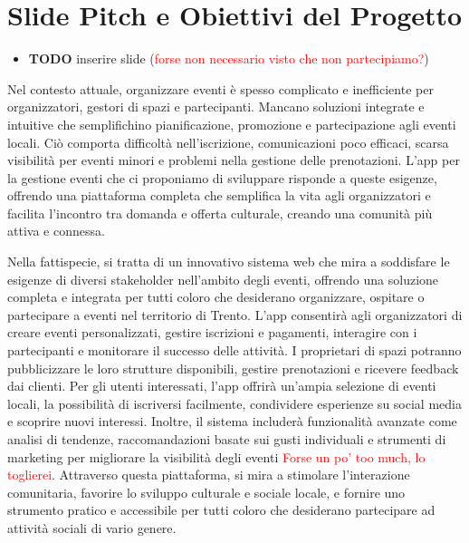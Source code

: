 \documentclass[9pt]{extarticle}
\begin{document}
\customtitle

\tableofcontents
\newpage

\section{Slide Pitch e Obiettivi del Progetto}

\begin{itemize}
	\item \textbf{TODO} inserire slide (\textcolor{red}{forse non necessario visto che non partecipiamo?})
\end{itemize}


Nel contesto attuale, organizzare eventi è spesso complicato e inefficiente per organizzatori, gestori di spazi e partecipanti. Mancano soluzioni integrate e intuitive che semplifichino pianificazione, promozione e partecipazione agli eventi locali. Ciò comporta difficoltà nell'iscrizione, comunicazioni poco efficaci, scarsa visibilità per eventi minori e problemi nella gestione delle prenotazioni. L'app per la gestione eventi che ci proponiamo di sviluppare risponde a queste esigenze, offrendo una piattaforma completa che semplifica la vita agli organizzatori e facilita l'incontro tra domanda e offerta culturale, creando una comunità più attiva e connessa.

Nella fattispecie, si tratta di un innovativo sistema web che mira a soddisfare le esigenze di diversi stakeholder nell'ambito degli eventi, offrendo una soluzione completa e integrata per tutti coloro che desiderano organizzare, ospitare o partecipare a eventi nel territorio di Trento. L'app consentirà agli organizzatori di creare eventi personalizzati, gestire iscrizioni e pagamenti, interagire con i partecipanti e monitorare il successo delle attività. I proprietari di spazi potranno pubblicizzare le loro strutture disponibili, gestire prenotazioni e ricevere feedback dai clienti. Per gli utenti interessati, l'app offrirà un'ampia selezione di eventi locali, la possibilità di iscriversi facilmente, condividere esperienze su social media e scoprire nuovi interessi. Inoltre, il sistema includerà funzionalità avanzate come analisi di tendenze, raccomandazioni basate sui gusti individuali e strumenti di marketing per migliorare la visibilità degli eventi \textcolor{red}{Forse un po' too much, lo toglierei}. Attraverso questa piattaforma, si mira a stimolare l'interazione comunitaria, favorire lo sviluppo culturale e sociale locale, e fornire uno strumento pratico e accessibile per tutti coloro che desiderano partecipare ad attività sociali di vario genere.
\end{document}
